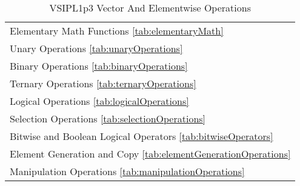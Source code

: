 \begin{table}[H]
\caption{VSIPL1p3 Vector And Elementwise Operations}
\label{tab:elementwiseChapter}
\begin{center}
\begin{tabular}{l}
Elementary Math Functions \ref{tab:elementaryMath}\\
Unary Operations \ref{tab:unaryOperations}\\
Binary Operations \ref{tab:binaryOperations}\\
Ternary Operations \ref{tab:ternaryOperations}\\
Logical Operations \ref{tab:logicalOperations}\\
Selection Operations \ref{tab:selectionOperations}\\
Bitwise and Boolean Logical Operators \ref{tab:bitwiseOperators}\\
Element Generation and Copy \ref{tab:elementGenerationOperations}\\
Manipulation Operations \ref{tab:manipulationOperations}\\
\end{tabular}
\end{center}
\label{default}
\end{table}%